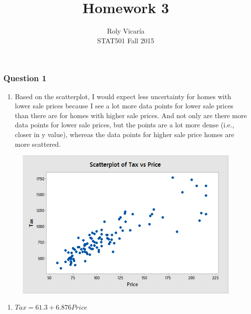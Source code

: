 \documentclass{article}
\title{Homework 3}
\author{Roly Vicar\'ia \\ STAT501 Fall 2015}
\providecommand{\tightlist}{%
      \setlength{\itemsep}{0pt}\setlength{\parskip}{0pt}}
\begin{document}
    
    
    \maketitle
    
    

    
    \subsubsection{Question 1}\label{question-1}

\begin{enumerate}
\def\labelenumi{\alph{enumi}.}
\tightlist
\item
  Based on the scatterplot, I would expect less uncertainty for homes
  with lower sale prices because I see a lot more data points for lower
  sale prices than there are for homes with higher sale prices. And not
  only are there more data points for lower sale prices, but the points
  are a lot more dense (i.e., closer in y value), whereas the data
  points for higher sale price homes are more scattered.
\end{enumerate}

\begin{figure}[h!]
 \centering
 \includegraphics[scale=.5]{./images/scatterplot_tax-vs-price.png}
\end{figure}


\begin{enumerate}
\def\labelenumi{\alph{enumi}.}
\setcounter{enumi}{1}
\tightlist
\item
  \(Tax = 61.3 + 6.876 Price\)
\end{enumerate}
\end{document}
